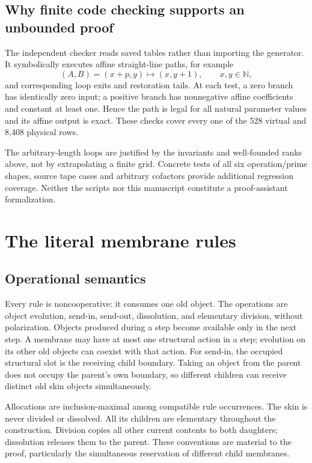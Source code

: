 \documentclass[11pt,letterpaper]{article}
\theoremstyle{definition}
\theoremstyle{remark}
\newcommand{\N}{\mathbb N}
\begin{document}
\subsection{Why finite code checking supports an unbounded proof}
The independent checker reads saved tables rather than importing the generator. It symbolically executes affine straight-line paths, for example
\[
 (A,B)=(x+p,y)\longmapsto(x,y+1),\qquad x,y\in\N,
\]
and corresponding loop exits and restoration tails. At each test, a zero branch has identically zero input; a positive branch has nonnegative affine coefficients and constant at least one. Hence the path is legal for all natural parameter values and its affine output is exact. These checks cover every one of the 528 virtual and 8,408 physical rows.

The arbitrary-length loops are justified by the invariants and well-founded ranks above, not by extrapolating a finite grid. Concrete tests of all six operation/prime shapes, source tape cases and arbitrary cofactors provide additional regression coverage. Neither the scripts nor this manuscript constitute a proof-assistant formalization.

\section{The literal membrane rules}\label{qoc:um:sec:rules}
\subsection{Operational semantics}
Every rule is noncooperative: it consumes one old object. The operations are object evolution, send-in, send-out, dissolution, and elementary division, without polarization. Objects produced during a step become available only in the next step. A membrane may have at most one structural action in a step; evolution on its other old objects can coexist with that action. For send-in, the occupied structural slot is the receiving child boundary. Taking an object from the parent does not occupy the parent's own boundary, so different children can receive distinct old skin objects simultaneously.

Allocations are inclusion-maximal among compatible rule occurrences. The skin is never divided or dissolved. All its children are elementary throughout the construction. Division copies all other current contents to both daughters; dissolution releases them to the parent. These conventions are material to the proof, particularly the simultaneous reservation of different child membranes.
\end{document}

